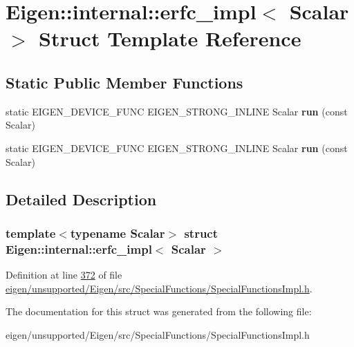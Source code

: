 \hypertarget{struct_eigen_1_1internal_1_1erfc__impl}{}\section{Eigen\+:\+:internal\+:\+:erfc\+\_\+impl$<$ Scalar $>$ Struct Template Reference}
\label{struct_eigen_1_1internal_1_1erfc__impl}
\subsection*{Static Public Member Functions}
\begin{DoxyCompactItemize}
\item 
\mbox{\label{struct_eigen_1_1internal_1_1erfc__impl_ab49297f201bf2abb48cd30d93cbb0d8d}} 
static E\+I\+G\+E\+N\+\_\+\+D\+E\+V\+I\+C\+E\+\_\+\+F\+U\+NC E\+I\+G\+E\+N\+\_\+\+S\+T\+R\+O\+N\+G\+\_\+\+I\+N\+L\+I\+NE Scalar {\bfseries run} (const Scalar)
\item 
\mbox{\label{struct_eigen_1_1internal_1_1erfc__impl_ab49297f201bf2abb48cd30d93cbb0d8d}} 
static E\+I\+G\+E\+N\+\_\+\+D\+E\+V\+I\+C\+E\+\_\+\+F\+U\+NC E\+I\+G\+E\+N\+\_\+\+S\+T\+R\+O\+N\+G\+\_\+\+I\+N\+L\+I\+NE Scalar {\bfseries run} (const Scalar)
\end{DoxyCompactItemize}


\subsection{Detailed Description}
\subsubsection*{template$<$typename Scalar$>$\newline
struct Eigen\+::internal\+::erfc\+\_\+impl$<$ Scalar $>$}



Definition at line \hyperlink{eigen_2unsupported_2_eigen_2src_2_special_functions_2_special_functions_impl_8h_source_l00372}{372} of file \hyperlink{eigen_2unsupported_2_eigen_2src_2_special_functions_2_special_functions_impl_8h_source}{eigen/unsupported/\+Eigen/src/\+Special\+Functions/\+Special\+Functions\+Impl.\+h}.



The documentation for this struct was generated from the following file\+:\begin{DoxyCompactItemize}
\item 
eigen/unsupported/\+Eigen/src/\+Special\+Functions/\+Special\+Functions\+Impl.\+h\end{DoxyCompactItemize}
